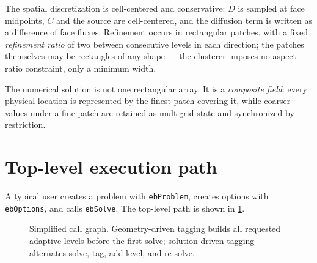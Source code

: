 \documentclass[11pt,oneside,openany]{book}
\newcommand{\code}[1]{\textnormal{\texttt{#1}}}
\begin{document}
The spatial discretization is cell-centered and conservative: $D$ is sampled at face midpoints, $C$ and the source are cell-centered, and the diffusion term is written as a difference of face fluxes. Refinement occurs in rectangular patches, with a fixed \emph{refinement ratio} of two between consecutive levels in each direction; the patches themselves may be rectangles of any shape --- the clusterer imposes no aspect-ratio constraint, only a minimum width.

\begin{keyidea}
The numerical solution is not one rectangular array. It is a \emph{composite field}: every physical location is represented by the finest patch covering it, while coarser values under a fine patch are retained as multigrid state and synchronized by restriction.
\end{keyidea}

\section{Top-level execution path}
A typical user creates a problem with \code{ebProblem}, creates options with \code{ebOptions}, and calls \code{ebSolve}. The top-level path is shown in \cref{fig:topcallgraph}.

\begin{figure}[htbp]
\centering
{}
\caption{Simplified call graph. Geometry-driven tagging builds all requested adaptive levels before the first solve; solution-driven tagging alternates solve, tag, add level, and re-solve.}
\label{fig:topcallgraph}
\end{figure}
\end{document}
